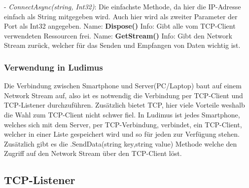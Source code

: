\newline \tab \newline
- \textit{ConnectAsync(string, Int32)}: Die einfachste Methode, da hier die IP-Adresse einfach als String mitgegeben wird. Auch hier wird als zweiter Parameter der Port als Int32 angegeben.
\newline \newline
Name: \textbf{Dispose()}
\newline
Info: Gibt alle vom TCP-Client verwendeten Ressourcen frei.
\newline \newline
Name: \textbf{GetStream()}
\newline
Info: Gibt den Network Stream zurück, welcher für das Senden und Empfangen von Daten wichtig ist.
\newline
\subsubsection{Verwendung in Ludimus}
Die Verbindung zwischen Smartphone und Server(PC/Laptop) baut auf einem Network Stream auf, also ist es notwendig die Verbindung per TCP-Client und TCP-Listener durchzuführen. Zusätzlich bietet TCP, hier viele Vorteile weshalb die Wahl zum TCP-Client nicht schwer fiel. In Ludimus ist jedes Smartphone, welches sich mit dem Server, per TCP-Verbindung, verbindet, ein TCP-Client, welcher in einer Liste gespeichert wird und so für jeden zur Verfügung stehen. Zusätzlich gibt es die .SendData(string key,string value) Methode welche den Zugriff auf den Network Stream über den TCP-Client löst.
\subsection{TCP-Listener} \label{TCP-Listener}
